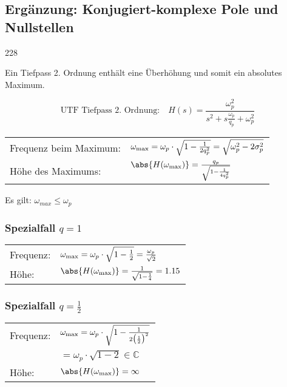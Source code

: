 \subsection{Ergänzung: Konjugiert-komplexe Pole und Nullstellen}{228}

Ein Tiefpass 2. Ordnung enthält eine Überhöhung und somit ein absolutes Maximum. 

$$ \text{UTF Tiefpass 2. Ordnung:} \quad H(s) = \frac{\omega_p^2}{s^2 + s \frac{\omega_p}{q_p} + \omega_p^2} $$

\renewcommand{\arraystretch}{2}
\begin{tabular}{ll}
    Frequenz beim Maximum:  & $ \omega_{\rm max} = \omega_p \cdot \sqrt{1 - \frac{1}{2 q_p^2}} = \sqrt{\omega_p^2 - 2 \sigma_p^2}$ \\
    Höhe des Maximums:      & $ \abs{H(\omega_{\rm max})} = \frac{q_p}{\sqrt{1 - \frac{1}{4 q_p^2}}}$ \\
\end{tabular}

\textrightarrow Es gilt: $\omega_{max} \leq \omega_p$


\subsubsection{Spezialfall $q = 1$}

\renewcommand{\arraystretch}{1.5}
\begin{minipage}[c]{0.55\columnwidth}    
    \begin{tabular}{ll}
        Frequenz:  & $ \omega_{\rm max} = \omega_p \cdot \sqrt{1 - \frac{1}{2}} = \frac{\omega_p}{\sqrt{2}}$ \\
        Höhe:      & $ \abs{H(\omega_{\rm max})} = \frac{1}{\sqrt{1 - \frac{1}{4}}} = 1.15$ \\
    \end{tabular}

\end{minipage}
\hfill
\begin{minipage}[c]{0.43\columnwidth}
    
\end{minipage}


\subsubsection{Spezialfall $q = \frac{1}{2}$}

\begin{minipage}[c]{0.55\columnwidth}
    \begin{tabular}{ll}
            Frequenz:  & $ \omega_{\rm max} = \omega_p \cdot \sqrt{1 - \frac{1}{2 \big(\frac{1}{2} \big)^2 }}$ \\
                       & $ = \omega_p \cdot \sqrt{1-2} \in \mathbb{C}$ \\
            Höhe:      & $ \abs{H(\omega_{\rm max})} = \infty$ \\   %
    \end{tabular}
\end{minipage}
\hfill
\begin{minipage}[c]{0.43\columnwidth}
    
\end{minipage}


